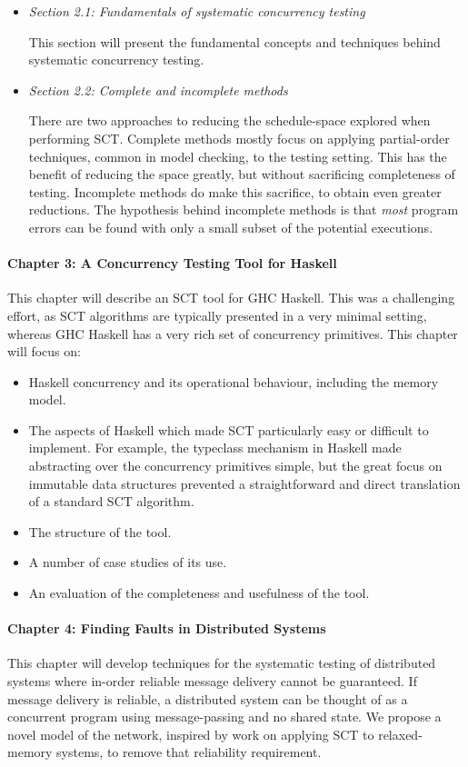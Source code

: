 \documentclass{article}
\begin{document}
\begin{itemize}
\item \emph{Section 2.1: Fundamentals of systematic concurrency testing}

  This section will present the fundamental concepts and techniques
  behind systematic concurrency testing.

\item \emph{Section 2.2: Complete and incomplete methods}

  There are two approaches to reducing the schedule-space explored
  when performing SCT. Complete methods mostly focus on applying
  partial-order techniques, common in model checking, to the testing
  setting. This has the benefit of reducing the space greatly, but
  without sacrificing completeness of testing. Incomplete methods do
  make this sacrifice, to obtain even greater reductions. The
  hypothesis behind incomplete methods is that \emph{most} program
  errors can be found with only a small subset of the potential
  executions.
\end{itemize}

\paragraph{Chapter 3: A Concurrency Testing Tool for Haskell} This
chapter will describe an SCT tool for GHC Haskell\cite{walker2015}.
This was a challenging effort, as SCT algorithms are typically
presented in a very minimal setting, whereas GHC Haskell has a very
rich set of concurrency primitives. This chapter will focus on:

\begin{itemize}
\item Haskell concurrency and its operational behaviour, including the
  memory model.
\item The aspects of Haskell which made SCT particularly easy or
  difficult to implement. For example, the typeclass mechanism in
  Haskell made abstracting over the concurrency primitives simple, but
  the great focus on immutable data structures prevented a
  straightforward and direct translation of a standard SCT algorithm.
\item The structure of the tool.
\item A number of case studies of its use.
\item An evaluation of the completeness and usefulness of the tool.
\end{itemize}

\paragraph{Chapter 4: Finding Faults in Distributed Systems} This
chapter will develop techniques for the systematic testing of
distributed systems where in-order reliable message delivery cannot be
guaranteed. If message delivery is reliable, a distributed system can
be thought of as a concurrent program using message-passing and no
shared state. We propose a novel model of the network, inspired by
work on applying SCT to relaxed-memory systems\cite{zhang2015}, to
remove that reliability requirement.
\end{document}
